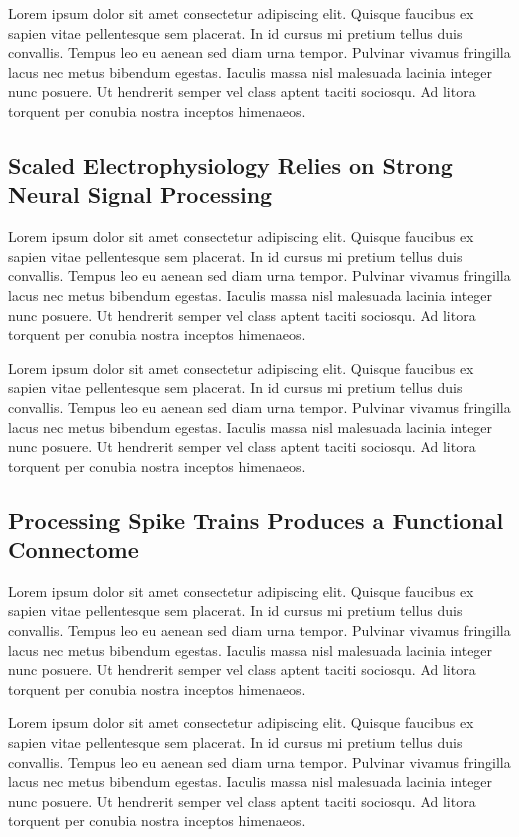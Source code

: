 \documentclass[11pt]{article}
\newcommand{\subsectionwithindent}[1]{
    \subsection*{#1}
    \hspace{\parindent} %
}
\begin{document}
Lorem ipsum dolor sit amet consectetur adipiscing elit. Quisque faucibus ex sapien vitae pellentesque sem placerat. In id cursus mi pretium tellus duis convallis. Tempus leo eu aenean sed diam urna tempor. Pulvinar vivamus fringilla lacus nec metus bibendum egestas. Iaculis massa nisl malesuada lacinia integer nunc posuere. Ut hendrerit semper vel class aptent taciti sociosqu. Ad litora torquent per conubia nostra inceptos himenaeos.

\subsectionwithindent{Scaled Electrophysiology Relies on Strong Neural Signal Processing}
Lorem ipsum dolor sit amet consectetur adipiscing elit. Quisque faucibus ex sapien vitae pellentesque sem placerat. In id cursus mi pretium tellus duis convallis. Tempus leo eu aenean sed diam urna tempor. Pulvinar vivamus fringilla lacus nec metus bibendum egestas. Iaculis massa nisl malesuada lacinia integer nunc posuere. Ut hendrerit semper vel class aptent taciti sociosqu. Ad litora torquent per conubia nostra inceptos himenaeos.

Lorem ipsum dolor sit amet consectetur adipiscing elit. Quisque faucibus ex sapien vitae pellentesque sem placerat. In id cursus mi pretium tellus duis convallis. Tempus leo eu aenean sed diam urna tempor. Pulvinar vivamus fringilla lacus nec metus bibendum egestas. Iaculis massa nisl malesuada lacinia integer nunc posuere. Ut hendrerit semper vel class aptent taciti sociosqu. Ad litora torquent per conubia nostra inceptos himenaeos.

\subsectionwithindent{Processing Spike Trains Produces a Functional Connectome}
Lorem ipsum dolor sit amet consectetur adipiscing elit. Quisque faucibus ex sapien vitae pellentesque sem placerat. In id cursus mi pretium tellus duis convallis. Tempus leo eu aenean sed diam urna tempor. Pulvinar vivamus fringilla lacus nec metus bibendum egestas. Iaculis massa nisl malesuada lacinia integer nunc posuere. Ut hendrerit semper vel class aptent taciti sociosqu. Ad litora torquent per conubia nostra inceptos himenaeos.

Lorem ipsum dolor sit amet consectetur adipiscing elit. Quisque faucibus ex sapien vitae pellentesque sem placerat. In id cursus mi pretium tellus duis convallis. Tempus leo eu aenean sed diam urna tempor. Pulvinar vivamus fringilla lacus nec metus bibendum egestas. Iaculis massa nisl malesuada lacinia integer nunc posuere. Ut hendrerit semper vel class aptent taciti sociosqu. Ad litora torquent per conubia nostra inceptos himenaeos.
\end{document}
